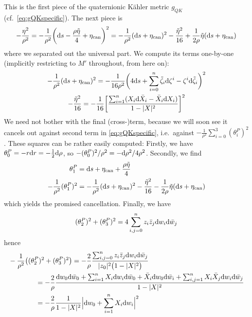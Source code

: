 This is the first piece of the quaternionic K\"ahler metric $g_{QK}$ (cf.~\cref{eq:gQKspecific}). The next piece is
\begin{equation*}
	-\frac{\eta^2}{\rho^2}
	=-\frac{1}{\rho^2}\bigg(\mathrm{d} s - \frac{\rho\tilde\eta}{4}+\eta_\text{can}\bigg)^2
	=-\frac{1}{\rho^2}(\mathrm{d} s +\eta_\text{can})^2-\frac{\tilde\eta^2}{16}
	+\frac{1}{2\rho}\tilde\eta(\mathrm{d} s +\eta_\text{can})
\end{equation*}
where we separated out the universal part. We compute its terms one-by-one (implicitly restricting to $M'$ throughout, from here on):
\begin{gather*}
	-\frac{1}{\rho^2}(\mathrm{d} s + \eta_\text{can})^2
	=-\frac{1}{16\rho^2}\bigg(4\mathrm{d} s+ \sum_{i=0}^n \tilde\zeta_i \mathrm{d} \zeta^i - \zeta^i \mathrm{d} \tilde\zeta_i\bigg)^2\\
	-\frac{\tilde\eta^2}{16}
	=-\frac{1}{16}\bigg[\frac{\sum_{i=1}^n (X_i \mathrm{d} \bar X_i - \bar X_i \mathrm{d} X_i)}{1-\lvert X \rvert^2}	\bigg]^2
\end{gather*}
We need not bother with the final (cross-)term, because we will soon see it cancels out against second term in \cref{eq:gQKspecific}, i.e.~against $-\frac{1}{\rho^2}\sum_{i=0}^3 (\theta^P_i)^2$. These squares can be rather easily computed: Firstly, we have $\theta^P_0=-r\mathrm{d} r=-\frac{1}{2}\mathrm{d} \rho$, so $-(\theta_0^P)^2/\rho^2=-\mathrm{d} \rho^2/4\rho^2$. Secondly, we find
\begin{align*}
	\theta^P_1&=\mathrm{d} s + \eta_\text{can} +\frac{\rho\tilde\eta}{4} \\
	-\frac{1}{\rho^2}(\theta_1^P)^2
	&=-\frac{1}{\rho^2}(\mathrm{d} s +\eta_\text{can})^2-\frac{\tilde\eta^2}{16}
	-\frac{1}{2\rho}\tilde\eta(\mathrm{d} s + \eta_\text{can})
\end{align*}
which yields the promised cancellation. Finally, we have
\begin{equation*}
	(\theta^P_2)^2+(\theta^P_3)^2=4\sum_{i,j=0}^n z_i \bar z_j \mathrm{d} w_i \mathrm{d} \bar w_j
\end{equation*}
hence
\begin{align*}
	&-\frac{1}{\rho^2}\big((\theta^P_2)^2+(\theta^P_3)^2\big)=-\frac{2}{\rho}\frac{\sum_{i,j=0}^nz_i\bar z_j \mathrm{d} w_i \mathrm{d} \bar w_j}{\lvert z_0 \rvert^2\big(1-\lvert X \rvert^2\big)}\\
	&\qquad\qquad=-\frac{2}{\rho}\frac{\mathrm{d} w_0 \mathrm{d} \bar w_0+\sum_{i=1}^n X_i \mathrm{d} w_i \mathrm{d} \bar w_0+\bar X_i \mathrm{d} w_0 \mathrm{d} \bar w_i
	+\sum_{i,j=1}^n X_i\bar X_j \mathrm{d} w_i \mathrm{d} \bar w_j}{1-\lvert X \rvert^2}\\
	&\qquad\qquad=-\frac{2}{\rho}\frac{1}{1-\lvert X \rvert^2}\Big|\mathrm{d} w_0 + \sum_{i=1}^n X_i \mathrm{d} w_i\Big|^2
\end{align*}
